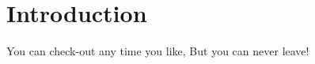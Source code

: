 \documentclass[Main]{subfiles}
\begin{document}
\section{Introduction}

\begin{fquote}You can check-out any time you like, But you can never leave!
 \end{fquote}
\end{document}
